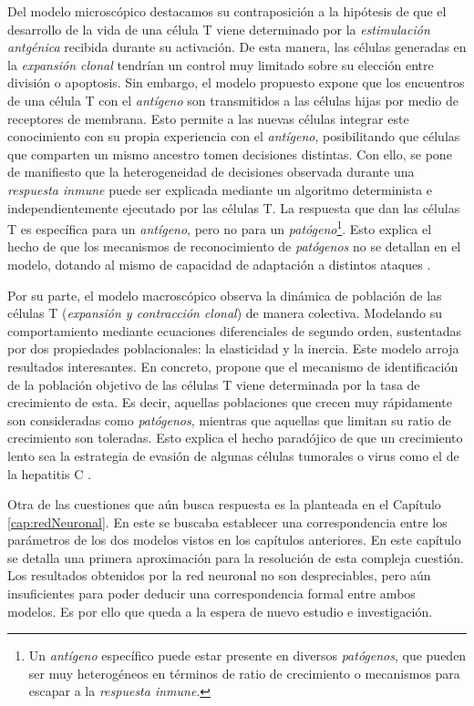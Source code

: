 Del modelo microscópico destacamos su contraposición a la hipótesis de que el desarrollo de la vida de una célula T viene determinado por la \textit{estimulación antgénica} recibida durante su activación. De esta manera, las células generadas en la \textit{expansión clonal} tendrían un control muy limitado sobre su elección entre división o apoptosis. Sin embargo, el modelo propuesto expone que los encuentros de una célula T con el \textit{antígeno} son transmitidos a las células hijas por medio de receptores de membrana. Esto permite a las nuevas células integrar este conocimiento con su propia experiencia con el \textit{antígeno}, posibilitando que células que comparten un mismo ancestro tomen decisiones distintas. Con ello, se pone de manifiesto que la heterogeneidad de decisiones observada durante una \textit{respuesta inmune} puede ser explicada mediante un algoritmo determinista e independientemente ejecutado por las células T. La respuesta que dan las células T es específica para un \textit{antígeno}, pero no para un \textit{patógeno}\footnote{Un \textit{antígeno} específico puede estar presente en diversos \textit{patógenos}, que pueden ser muy heterogéneos en términos de ratio de crecimiento o mecanismos para escapar a la \textit{respuesta inmune}.}. Esto explica el hecho de que los mecanismos de reconocimiento de \textit{patógenos} no se detallan en el modelo, dotando al mismo de capacidad de adaptación a distintos ataques \citep{JTB}.

Por su parte, el modelo macroscópico observa la dinámica de población de las células T (\textit{expansión y contracción clonal}) de manera colectiva. Modelando su comportamiento mediante ecuaciones diferenciales de segundo orden, sustentadas por dos propiedades poblacionales: la elasticidad y la inercia. Este modelo arroja resultados interesantes. En concreto, propone que el mecanismo de identificación de la población objetivo de las células T viene determinada por la tasa de crecimiento de esta. Es decir, aquellas poblaciones que crecen muy rápidamente son consideradas como \textit{patógenos}, mientras que aquellas que limitan su ratio de crecimiento son toleradas. Esto explica el hecho paradójico de que un crecimiento lento sea la estrategia de evasión de algunas células tumorales o virus como el de la hepatitis C \citep{arias2015growth}. 

Otra de las cuestiones que aún busca respuesta es la planteada en el Capítulo \ref{cap:redNeuronal}. En este se buscaba establecer una correspondencia entre los parámetros de los dos modelos vistos en los capítulos anteriores. En este capítulo se detalla una primera aproximación para la resolución de esta compleja cuestión. Los resultados obtenidos por la red neuronal no son despreciables, pero aún insuficientes para poder deducir una correspondencia formal entre ambos modelos. Es por ello que queda a la espera de nuevo estudio e investigación.

